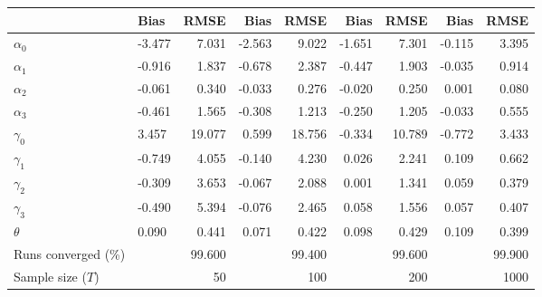 
\begin{tabular}[t]{llrrrrrrr}
\toprule
  & Bias & RMSE & Bias & RMSE & Bias & RMSE & Bias & RMSE\\
\midrule
$\alpha_{0}$ & -3.477 & 7.031 & -2.563 & 9.022 & -1.651 & 7.301 & -0.115 & 3.395\\
$\alpha_{1}$ & -0.916 & 1.837 & -0.678 & 2.387 & -0.447 & 1.903 & -0.035 & 0.914\\
$\alpha_{2}$ & -0.061 & 0.340 & -0.033 & 0.276 & -0.020 & 0.250 & 0.001 & 0.080\\
$\alpha_{3}$ & -0.461 & 1.565 & -0.308 & 1.213 & -0.250 & 1.205 & -0.033 & 0.555\\
$\gamma_{0}$ & 3.457 & 19.077 & 0.599 & 18.756 & -0.334 & 10.789 & -0.772 & 3.433\\
$\gamma_{1}$ & -0.749 & 4.055 & -0.140 & 4.230 & 0.026 & 2.241 & 0.109 & 0.662\\
$\gamma_{2}$ & -0.309 & 3.653 & -0.067 & 2.088 & 0.001 & 1.341 & 0.059 & 0.379\\
$\gamma_{3}$ & -0.490 & 5.394 & -0.076 & 2.465 & 0.058 & 1.556 & 0.057 & 0.407\\
$\theta$ & 0.090 & 0.441 & 0.071 & 0.422 & 0.098 & 0.429 & 0.109 & 0.399\\
Runs converged (\%) &  & 99.600 &  & 99.400 &  & 99.600 &  & 99.900\\
Sample size ($T$) &  & 50 &  & 100 &  & 200 &  & 1000\\
\bottomrule
\end{tabular}
